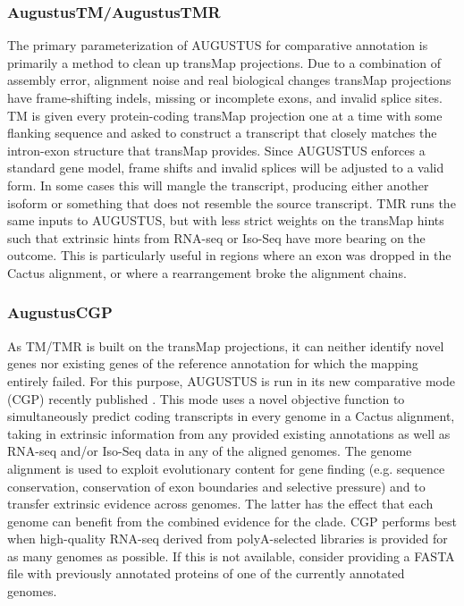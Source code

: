 \documentclass[fleqn,10pt]{wlscirep}
\begin{document}
\subsubsection*{AugustusTM/AugustusTMR}
	The primary parameterization of AUGUSTUS for comparative annotation is primarily a method to clean up transMap projections. Due to a combination of assembly error, alignment noise and real biological changes transMap projections have frame-shifting indels, missing or incomplete exons, and invalid splice sites. TM is given every protein-coding transMap projection one at a time with some flanking sequence and asked to construct a transcript that closely matches the intron-exon structure that transMap provides. Since AUGUSTUS enforces a standard gene model, frame shifts and invalid splices will be adjusted to a valid form. In some cases this will mangle the transcript, producing either another isoform or something that does not resemble the source transcript. TMR runs the same inputs to AUGUSTUS, but with less strict weights on the transMap hints such that extrinsic hints from RNA-seq or Iso-Seq have more bearing on the outcome. This is particularly useful in regions where an exon was dropped in the Cactus alignment, or where a rearrangement broke the alignment chains.
  
\subsubsection*{AugustusCGP}
	As TM/TMR is built on the transMap projections, it can neither identify novel genes nor existing genes of the reference annotation for which the mapping entirely failed. For this purpose, AUGUSTUS is run in its new comparative mode (CGP) recently published \cite{konig2015simultaneous}. This mode uses a novel objective function to simultaneously predict coding transcripts in every genome in a Cactus alignment, taking in extrinsic information from any provided existing annotations as well as RNA-seq and/or Iso-Seq data in any of the aligned genomes. The genome alignment is used to exploit evolutionary content for gene finding (e.g. sequence conservation, conservation of exon boundaries and selective pressure) and to transfer extrinsic evidence across genomes. The latter has the effect that each genome can benefit from the combined evidence for the clade. CGP performs best when high-quality RNA-seq derived from polyA-selected libraries is provided for as many genomes as possible. If this is not available, consider providing a FASTA file with previously annotated proteins of one of the currently annotated genomes. 
  
\end{document}
